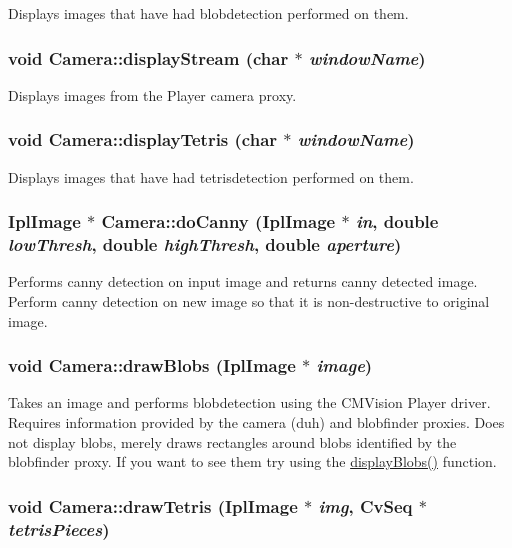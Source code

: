\label{classCamera_af4d89ca5c815928bdf8cf1cf8cb0f058}
Displays images that have had blobdetection performed on them. \hypertarget{classCamera_a291c3ab32f380f2e8e9258793daeff5d}{
\subsubsection[{displayStream}]{\setlength{\rightskip}{0pt plus 5cm}void Camera::displayStream (char $\ast$ {\em windowName})}}
\label{classCamera_a291c3ab32f380f2e8e9258793daeff5d}
Displays images from the Player camera proxy. \hypertarget{classCamera_a5ac21f1748d653d29a4173814386029c}{
\subsubsection[{displayTetris}]{\setlength{\rightskip}{0pt plus 5cm}void Camera::displayTetris (char $\ast$ {\em windowName})}}
\label{classCamera_a5ac21f1748d653d29a4173814386029c}
Displays images that have had tetrisdetection performed on them. \hypertarget{classCamera_ac5c9f313998f788fa4924a1a341fd96a}{
\subsubsection[{doCanny}]{\setlength{\rightskip}{0pt plus 5cm}IplImage $\ast$ Camera::doCanny (IplImage $\ast$ {\em in}, \/  double {\em lowThresh}, \/  double {\em highThresh}, \/  double {\em aperture})}}
\label{classCamera_ac5c9f313998f788fa4924a1a341fd96a}
Performs canny detection on input image and returns canny detected image. Perform canny detection on new image so that it is non-\/destructive to original image. \hypertarget{classCamera_ab2cdb9c79a3058c31fe3ccd04c8b4982}{
\subsubsection[{drawBlobs}]{\setlength{\rightskip}{0pt plus 5cm}void Camera::drawBlobs (IplImage $\ast$ {\em image})}}
\label{classCamera_ab2cdb9c79a3058c31fe3ccd04c8b4982}
Takes an image and performs blobdetection using the CMVision Player driver. Requires information provided by the camera (duh) and blobfinder proxies. Does not display blobs, merely draws rectangles around blobs identified by the blobfinder proxy. If you want to see them try using the \hyperlink{classCamera_af4d89ca5c815928bdf8cf1cf8cb0f058}{displayBlobs()} function. \hypertarget{classCamera_a7b2811cc03fcdafa686a76863f2847c1}{
\subsubsection[{drawTetris}]{\setlength{\rightskip}{0pt plus 5cm}void Camera::drawTetris (IplImage $\ast$ {\em img}, \/  CvSeq $\ast$ {\em tetrisPieces})}}
